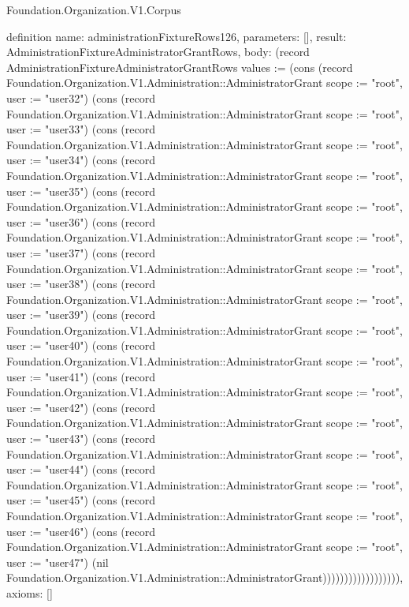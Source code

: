 \begin{lexlean}{Foundation.Organization.V1.Corpus}
\begin{semanticmodule}
definition{
  name: administrationFixtureRows126,
  parameters: [],
  result: AdministrationFixtureAdministratorGrantRows,
  body: (record AdministrationFixtureAdministratorGrantRows {values := (cons (record Foundation.Organization.V1.Administration::AdministratorGrant {scope := "root", user := "user32"}) (cons (record Foundation.Organization.V1.Administration::AdministratorGrant {scope := "root", user := "user33"}) (cons (record Foundation.Organization.V1.Administration::AdministratorGrant {scope := "root", user := "user34"}) (cons (record Foundation.Organization.V1.Administration::AdministratorGrant {scope := "root", user := "user35"}) (cons (record Foundation.Organization.V1.Administration::AdministratorGrant {scope := "root", user := "user36"}) (cons (record Foundation.Organization.V1.Administration::AdministratorGrant {scope := "root", user := "user37"}) (cons (record Foundation.Organization.V1.Administration::AdministratorGrant {scope := "root", user := "user38"}) (cons (record Foundation.Organization.V1.Administration::AdministratorGrant {scope := "root", user := "user39"}) (cons (record Foundation.Organization.V1.Administration::AdministratorGrant {scope := "root", user := "user40"}) (cons (record Foundation.Organization.V1.Administration::AdministratorGrant {scope := "root", user := "user41"}) (cons (record Foundation.Organization.V1.Administration::AdministratorGrant {scope := "root", user := "user42"}) (cons (record Foundation.Organization.V1.Administration::AdministratorGrant {scope := "root", user := "user43"}) (cons (record Foundation.Organization.V1.Administration::AdministratorGrant {scope := "root", user := "user44"}) (cons (record Foundation.Organization.V1.Administration::AdministratorGrant {scope := "root", user := "user45"}) (cons (record Foundation.Organization.V1.Administration::AdministratorGrant {scope := "root", user := "user46"}) (cons (record Foundation.Organization.V1.Administration::AdministratorGrant {scope := "root", user := "user47"}) (nil Foundation.Organization.V1.Administration::AdministratorGrant)))))))))))))))))}),
  axioms: []
}


\end{semanticmodule}
\end{lexlean}
